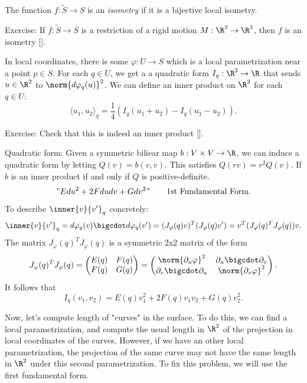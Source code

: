 \begin{definition}
    The function $f : \tilde{S} \to S$ is an \textit{isometry} if it is a bijective local isometry.
\end{definition}

\noindent Exercise: If $f : \tilde{S} \to S$ is a restriction of a rigid motion $M : \R^3 \to \R^3$, then $f$ is an isometry [\td].

In local coordinates, there is some $\varphi : U \to S$ which is a local parametrization near a point $p \in S$. For each $q \in U$, we get a a quadratic form $I_q : \R^2 \to \R$ that sends $u \in \R^2$ to $\norm{d\varphi_q(u)}^2$. We can define an inner product on $\R^2$ for each $q \in U$:
$$\langle u_1, u_2 \rangle_q = \frac{1}{4}(I_q(u_1 + u_2) - I_q(u_1 - u_2)).$$

\noindent Exercise: Check that this is indeed an inner product [\td].

Quadratic form: Given a symmetric biliear map $b : V\times V \to \R$, we can induce a quadratic form by letting $Q(v) = b(v,v)$. This satisfies $Q(rv) = r^2Q(v)$. If $b$ is an inner product if and only if $Q$ is positive-definite. 
$$"Edu^2 + 2Fdudv + Gdv^2" \qquad \text{1st Fundamental Form.}$$
To describe $\inner{v}{v'}_q$ concretely:
$$\inner{v}{v'}_q = d\varphi_q(v)\bigcdot d\varphi_q(v') = (J_{\varphi}(q)v)^T(J_{\varphi}(q)v') = v^T(J_{\varphi}(q)^TJ_{\varphi}(q))v.$$
The matrix $J_{\varphi}(q)^TJ_{\varphi}(q)$ is a symmetric 2x2 matrix of the form
$$J_{\varphi}(q)^TJ_{\varphi}(q) = \begin{pmatrix}
    E(q) & F(q) \\ F(q) & G(q) 
\end{pmatrix} = \begin{pmatrix}
    \norm{\partial_u \varphi}^2 & \partial_u \bigcdot \partial_v \\
    \partial_v \bigcdot \partial_u & \norm{\partial_v \varphi}^2
\end{pmatrix}.$$
It follows that
$$I_q(v_1, v_2) = E(q)v_1^2 + 2F(q)v_1v_2 + G(q)v_2^2.$$

Now, let's compute length of "curves" in the surface. To do this, we can find a local parametrization, and compute the usual length in $\R^2$ of the projection in local coordinates of the curves. However, if we have an other local parametrization, the projection of the same curve may not have the same length in $\R^2$ under this second parametrization. To fix this problem, we will use the first fundamental form.\\

